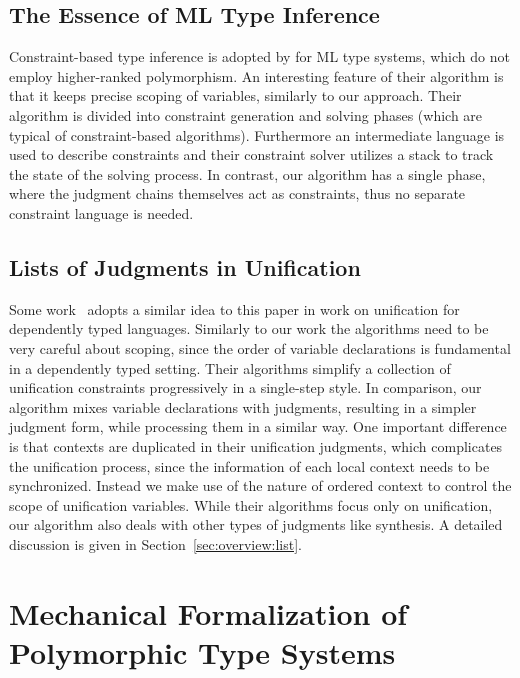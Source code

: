 \subsection{The Essence of ML Type Inference}
Constraint-based type inference is adopted by \citet{remy-attapl} for
ML type systems, which do not employ higher-ranked polymorphism. An
interesting feature of their algorithm is that it keeps precise
scoping of variables, similarly to our approach.  Their algorithm is
divided into constraint generation and solving phases (which are
typical of constraint-based algorithms). Furthermore an intermediate
language is used to describe constraints and their constraint solver
utilizes a stack to track the state of the solving process.  In
contrast, our algorithm has a single phase, where the judgment chains
themselves act as constraints, thus no separate constraint language is
needed.


\subsection{Lists of Judgments in Unification}
Some work~\citep{Reed2009,Abel2011higher} adopts a similar idea to this paper
in work on unification for dependently typed languages. Similarly to our work
the algorithms need to be very careful about scoping, since the order of variable
declarations is fundamental in a dependently typed setting. 
Their algorithms simplify a collection of unification constraints progressively in a single-step style.
In comparison, our algorithm mixes variable declarations with judgments,
resulting in a simpler judgment form,
while processing them in a similar way.
One important difference is that contexts are
duplicated in their unification judgments, which complicates the unification process,
since the information of each local context needs to be synchronized.
Instead we make use of the nature of ordered context to control the scope of unification variables.
While their algorithms focus only on unification,
our algorithm also deals with other types of judgments like synthesis.
A detailed discussion is given in Section~\ref{sec:overview:list}.





\section{Mechanical Formalization of Polymorphic Type Systems}

